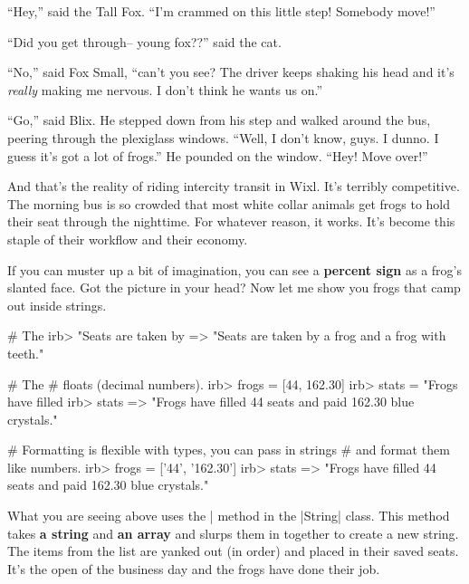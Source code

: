 \documentclass[12pt,twoside]{report}
\begin{document}
``Hey,'' said the Tall Fox.  ``I'm crammed on this little step!
        Somebody move!''

``Did you get through-- young fox??'' said the cat.

``No,'' said Fox Small, ``can't you see?  The driver keeps shaking his
        head and it's {\em really} making me nervous.  I don't think
        he wants us on.''

``Go,'' said Blix.  He stepped down from his step and walked around
        the bus, peering through the plexiglass windows.  ``Well, I
        don't know, guys.  I dunno.  I guess it's got a lot of
        frogs.''  He pounded on the window.  ``Hey!  Move over!''

And that's the reality of riding intercity transit in Wixl.  It's
terribly competitive.  The morning bus is so crowded that most white
collar animals get frogs to hold their seat through the nighttime. For
whatever reason, it works.  It's become this staple of their workflow
and their economy.

If you can muster up a bit of imagination, you can see a {\bf percent
  sign} as a frog's slanted face. Got the picture in your head?  Now
let me show you frogs that camp out inside strings.


\begin{consolecode}

 # The %
 irb> "Seats are taken by %
   => "Seats are taken by a frog and a frog with teeth."

 # The %
 # floats (decimal numbers).
 irb> frogs = [44, 162.30]
 irb> stats = "Frogs have filled %
 irb> stats %
   => "Frogs have filled 44 seats and paid 162.30 blue crystals."

 # Formatting is flexible with types, you can pass in strings
 # and format them like numbers.
 irb> frogs = ['44', '162.30']
 irb> stats %
   => "Frogs have filled 44 seats and paid 162.30 blue crystals."

\end{consolecode}


What you are seeing above uses the \rubyinline|%
method in the \rubyinline|String| class. This method
takes {\bf a string} and {\bf an array} and slurps them in together to
create a new string.  The items from the list are yanked out (in
order) and placed in their saved seats.  It's the open of the business
day and the frogs have done their job.
\end{document}
